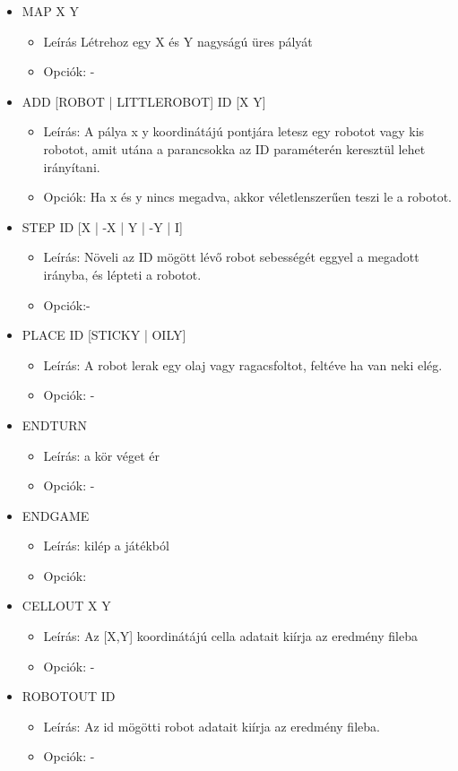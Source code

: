 \begin{itemize}
\item MAP X Y
	\begin{itemize}
	\item Leírás Létrehoz egy X és Y nagyságú üres pályát
	\item Opciók: -
	\end{itemize}
	
\item ADD [ROBOT | LITTLEROBOT] ID [X Y]
	\begin{itemize}
	\item Leírás: A pálya x y koordinátájú pontjára letesz egy robotot vagy kis robotot, amit utána a parancsokka az ID paraméterén keresztül lehet irányítani.
	 
	\item Opciók: Ha x és y nincs megadva, akkor véletlenszerűen teszi le a robotot.
	\end{itemize}

\item STEP ID [X | -X | Y | -Y | I]
\begin{itemize}
	\item Leírás: Növeli az ID mögött lévő robot sebességét eggyel a megadott irányba, és lépteti a robotot.
	\item Opciók:-
\end{itemize}


\item PLACE ID [STICKY | OILY]
\begin{itemize}
	\item Leírás: A robot lerak egy olaj vagy ragacsfoltot, feltéve ha van neki elég.
	\item Opciók: -
\end{itemize}

\item ENDTURN
\begin{itemize}
	\item Leírás: a kör véget ér
	\item Opciók: -
\end{itemize}


\item ENDGAME
\begin{itemize}
	\item Leírás: kilép a játékból
	\item Opciók:
\end{itemize}

\item CELLOUT X Y
\begin{itemize}
	\item Leírás: Az [X,Y] koordinátájú cella adatait kiírja az eredmény fileba
	\item Opciók: -
\end{itemize}

\item ROBOTOUT ID
\begin{itemize}
	\item Leírás: Az id mögötti robot adatait kiírja az eredmény fileba.
	\item Opciók: -
\end{itemize}

\end{itemize}

